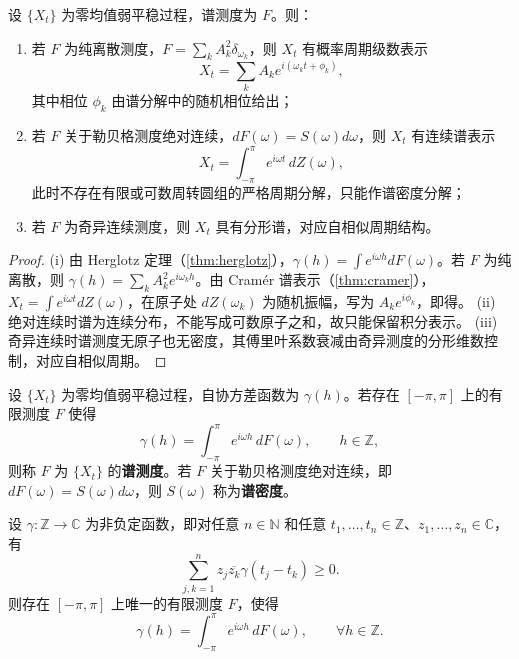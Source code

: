 \begin{theorem}[由概率数据构建周期级数]\label{thm:prob_series_reconstruction}
设 $\{X_t\}$ 为零均值弱平稳过程，谱测度为 $F$。则：
\begin{enumerate}[label=(\roman*)]
    \item 若 $F$ 为纯离散测度，$F=\sum_k A_k^2\delta_{\omega_k}$，则 $X_t$ 有概率周期级数表示
    \[
    X_t=\sum_k A_k e^{i(\omega_k t+\phi_k)},
    \]
    其中相位 $\phi_k$ 由谱分解中的随机相位给出；
    \item 若 $F$ 关于勒贝格测度绝对连续，$dF(\omega)=S(\omega)d\omega$，则 $X_t$ 有连续谱表示
    \[
    X_t=\int_{-\pi}^{\pi}e^{i\omega t}\,dZ(\omega),
    \]
    此时不存在有限或可数周转圆组的严格周期分解，只能作谱密度分解；
    \item 若 $F$ 为奇异连续测度，则 $X_t$ 具有分形谱，对应自相似周期结构。
\end{enumerate}
\end{theorem}

\begin{proof}
(i) 由 Herglotz 定理（\cref{thm:herglotz}），$\gamma(h)=\int e^{i\omega h}dF(\omega)$。若 $F$ 为纯离散，则 $\gamma(h)=\sum_k A_k^2 e^{i\omega_k h}$。由 Cramér 谱表示（\cref{thm:cramer}），$X_t=\int e^{i\omega t}dZ(\omega)$，在原子处 $dZ(\omega_k)$ 为随机振幅，写为 $A_k e^{i\phi_k}$，即得。
(ii) 绝对连续时谱为连续分布，不能写成可数原子之和，故只能保留积分表示。
(iii) 奇异连续时谱测度无原子也无密度，其傅里叶系数衰减由奇异测度的分形维数控制，对应自相似周期。
\end{proof}

\begin{definition}[谱测度与谱分布函数]\label{def:spectral_measure}
设 $\{X_t\}$ 为零均值弱平稳过程，自协方差函数为 $\gamma(h)$。若存在 $[-\pi,\pi]$ 上的有限测度 $F$ 使得
\[
\gamma(h)=\int_{-\pi}^{\pi}e^{i\omega h}\,dF(\omega),\qquad h\in\mathbb Z,
\]
则称 $F$ 为 $\{X_t\}$ 的\textbf{谱测度}。若 $F$ 关于勒贝格测度绝对连续，即 $dF(\omega)=S(\omega)d\omega$，则 $S(\omega)$ 称为\textbf{谱密度}。
\end{definition}

\begin{theorem}[Herglotz 定理]\label{thm:herglotz}
设 $\gamma:\mathbb Z\to\mathbb C$ 为非负定函数，即对任意 $n\in\mathbb N$ 和任意 $t_1,\dots,t_n\in\mathbb Z$、$z_1,\dots,z_n\in\mathbb C$，有
\[
\sum_{j,k=1}^{n}z_j\overline{z_k}\gamma(t_j-t_k)\ge0.
\]
则存在 $[-\pi,\pi]$ 上唯一的有限测度 $F$，使得
\[
\gamma(h)=\int_{-\pi}^{\pi}e^{i\omega h}\,dF(\omega),\qquad \forall h\in\mathbb Z.
\]
\end{theorem}

